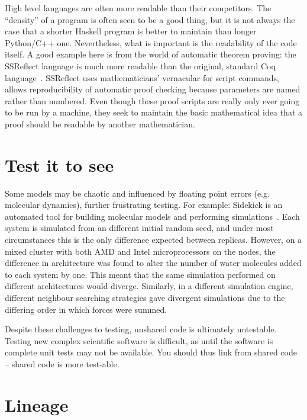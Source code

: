 \documentclass[conference]{IEEEtran}
\begin{document}
High level languages are often more readable than their
competitors. The ``density'' of a program is often seen to be a good
thing, but it is not always the case that a shorter Haskell program is
better to maintain than longer Python/C++ one. Nevertheless, what is
important is the readability of the code itself. A good example here
is from the world of automatic theorem proving: the SSReflect language
is much more readable than the original, standard Coq
language~\cite{GonthierZND13}. SSReflect uses mathematicians'
vernacular for script commands, allows reproducibility of automatic
proof checking because parameters are named rather than numbered. 
Even though these proof scripts are really only ever going to be
run by a machine, they seek to maintain the basic mathematical idea
that a proof should be readable by another mathematician.

\section{Test it to see}

Some models may be chaotic and influenced by floating point errors
(e.g. molecular dynamics), further frustrating testing. For example:
Sidekick is an automated tool for building molecular models and
performing simulations~\cite{Hall2014Sidekick}. Each system is
simulated from an different initial random seed, and under most
circumstances this is the only difference expected between
replicas. However, on a mixed cluster with both AMD and Intel
microprocessors on the nodes, the difference in architecture was found
to alter the number of water molecules added to each system by
one. This meant that the same simulation performed on different
architectures would diverge. Similarly, in a different simulation
engine, different neighbour searching strategies gave divergent
simulations due to the differing order in which forces were summed.

Despite these challenges to testing, unshared code is ultimately
untestable.  Testing new complex scientific software is difficult, as
until the software is complete unit tests may not be available. You
should thus link from shared code -- shared code is more test-able.

\section{Lineage} 
\end{document}
